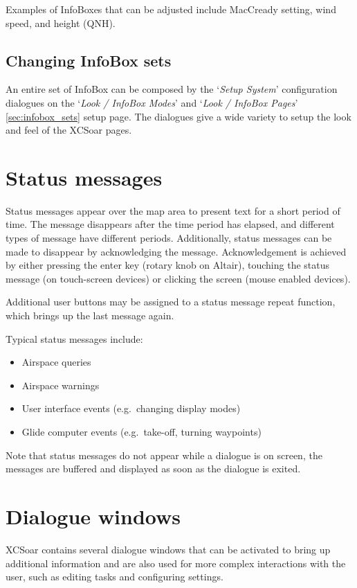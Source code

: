 Examples of InfoBoxes that can
be adjusted include MacCready setting, wind speed, and height (QNH).


\subsection*{Changing InfoBox sets}

An entire set of InfoBox can be composed by the `{\it Setup System}' configuration 
dialogues on the `{\it Look / InfoBox Modes}' and `{\it Look / InfoBox Pages}' 
\ref{sec:infobox_sets} setup page. 
The dialogues give a wide variety to setup the look and feel of the XCSoar pages.  


\section{Status messages}

Status messages appear over the map area to present text for a short period of
time.  The message disappears after the time period has elapsed, and different
types of message have different periods. Additionally, status messages can be
made to disappear by acknowledging the message.  Acknowledgement is achieved by
either pressing the enter key (rotary knob on Altair), touching the status
message (on touch-screen devices) or clicking the screen (mouse enabled devices).

Additional user buttons may be assigned to a status message repeat function,
which brings up the last message again.

Typical status messages include:
\begin{itemize}
\item Airspace queries
\item Airspace warnings
\item User interface events (e.g.\ changing display modes)
\item Glide computer events (e.g.\ take-off, turning waypoints)
\end{itemize}

Note that status messages do not appear while a dialogue is on screen, the
messages are buffered and displayed as soon as the dialogue is exited.


\section{Dialogue windows}\label{sec:dialog-windows}

XCSoar contains several dialogue windows that can be activated to bring up
additional information and are also used for more complex interactions with the
user, such as editing tasks and configuring settings.

